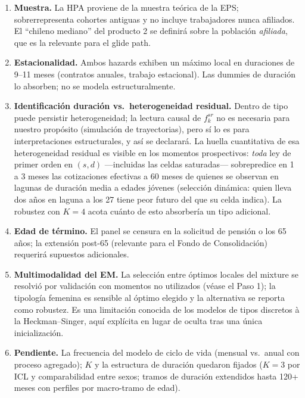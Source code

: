 \documentclass[11pt]{article}
\begin{document}
\begin{enumerate}
\item \textbf{Muestra.} La HPA proviene de la muestra teórica de la EPS;
sobrerrepresenta cohortes antiguas y no incluye trabajadores nunca afiliados.
El ``chileno mediano'' del producto 2 se definirá sobre la población
\emph{afiliada}, que es la relevante para el glide path.
\item \textbf{Estacionalidad.} Ambos hazards exhiben un máximo local en
duraciones de 9--11 meses (contratos anuales, trabajo estacional). Las
dummies de duración lo absorben; no se modela estructuralmente.
\item \textbf{Identificación duración vs.\ heterogeneidad residual.} Dentro
de tipo puede persistir heterogeneidad; la lectura causal de $f^{sr}_k$ no es
necesaria para nuestro propósito (simulación de trayectorias), pero sí lo es
para interpretaciones estructurales, y así se declarará. La huella
cuantitativa de esa heterogeneidad residual es visible en los momentos
prospectivos: \emph{toda} ley de primer orden en $(s,d)$ —incluidas las
celdas saturadas— sobrepredice en 1 a 3 meses las cotizaciones efectivas a
60 meses de quienes se observan en lagunas de duración media a edades
jóvenes (selección dinámica: quien lleva dos años en laguna a los 27 tiene
peor futuro del que su celda indica). La robustez con $K=4$ acota cuánto de
esto absorbería un tipo adicional.
\item \textbf{Edad de término.} El panel se censura en la solicitud de
pensión o los 65 años; la extensión post-65 (relevante para el Fondo de
Consolidación) requerirá supuestos adicionales.
\item \textbf{Multimodalidad del EM.} La selección entre óptimos locales
del mixture se resolvió por validación con momentos no utilizados (véase el
Paso 1); la tipología femenina es sensible al óptimo elegido y la
alternativa se reporta como robustez. Es una limitación conocida de los
modelos de tipos discretos à la Heckman--Singer, aquí explícita en lugar de
oculta tras una única inicialización.
\item \textbf{Pendiente.} La frecuencia del modelo de ciclo de vida
(mensual vs.\ anual con proceso agregado); $K$ y la estructura de duración
quedaron fijados ($K=3$ por ICL y comparabilidad entre sexos; tramos de
duración extendidos hasta 120+ meses con perfiles por macro-tramo de edad).
\end{enumerate}



\end{document}
